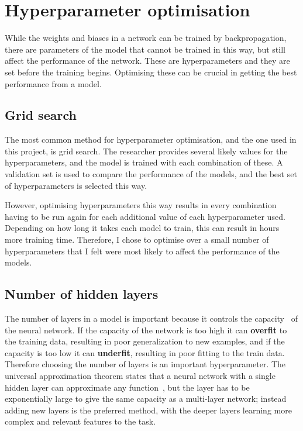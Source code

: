 \section{Hyperparameter optimisation} \label{hyper}
While the weights and biases in a network can be trained by backpropagation, there are parameters of the model that cannot be trained in 
this way, but still affect the performance of the network. These are hyperparameters and they are set before the training begins. 
Optimising these can be crucial in getting the best performance from a model.

\subsection{Grid search}
The most common method for hyperparameter optimisation, and the one used in this project, is grid search. The researcher provides several 
likely values for the hyperparameters, and the model is trained with each combination of these. A validation set is used to compare the
performance of the models, and the best set of hyperparameters is selected this way.

However, optimising hyperparameters this way results in every combination having to be run again for each additional value of each
hyperparameter used. Depending on how long it takes each model to train, this can result in hours more training time. 
Therefore, I chose to optimise over a small number of hyperparameters that I felt were most likely to affect the performance of the models.

\subsection{Number of hidden layers}
The number of layers in a model is important because it controls the capacity~\cite{Goodfellow-et-al-2016} of the neural network. If the 
capacity of the network is too high it can \textbf{overfit} to the training data, resulting in poor generalization to new examples, and if the capacity is 
too low it can \textbf{underfit}, resulting in poor fitting to the train data. Therefore choosing the number of layers is an important hyperparameter.
The universal approximation theorem states that a neural network with a single hidden layer can approximate any function~\cite{DBLP:journals/mcss/Cybenko92}, but the layer 
has to be exponentially large to give the same capacity as a multi-layer network; instead adding new layers is the preferred method, 
with the deeper layers learning more complex and relevant features to the task.

